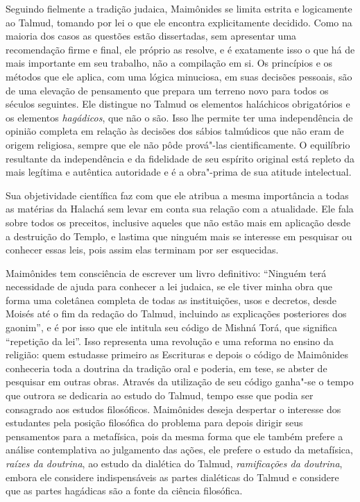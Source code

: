 Seguindo fielmente a tradição judaica, Maimônides se limita estrita e
logicamente ao Talmud, tomando por lei o que ele encontra
explicitamente decidido. Como na maioria dos casos as questões estão
dissertadas, sem apresentar uma recomendação firme e final, ele próprio
as resolve, e é exatamente isso o que há de mais importante em seu
trabalho, não a compilação em si. Os princípios e os métodos que ele
aplica, com uma lógica minuciosa, em suas decisões pessoais, são de uma
elevação de pensamento que prepara um terreno novo para todos os séculos
seguintes. Ele distingue no Talmud os elementos haláchicos
obrigatórios e os elementos \emph{hagádicos}, que não o são. Isso lhe permite
ter uma independência de opinião completa em relação às decisões dos
sábios talmúdicos que não eram de origem religiosa, sempre que ele não
pôde prová"-las cientificamente. O equilíbrio resultante da independência
e da fidelidade de seu espírito original está repleto da mais legítima
e autêntica autoridade e é a obra"-prima de sua atitude intelectual.

Sua objetividade científica faz com que ele atribua a mesma importância
a todas as matérias da Halachá sem levar em conta sua relação com a
atualidade. Ele fala sobre todos os preceitos, inclusive aqueles que não
estão mais em aplicação desde a destruição do Templo, e lastima que
ninguém mais se interesse em pesquisar ou conhecer essas leis, pois
assim elas terminam por ser esquecidas.

Maimônides tem consciência de escrever um livro definitivo: ``Ninguém
terá necessidade de ajuda para conhecer a lei judaica, se ele tiver
minha obra que forma uma coletânea completa de todas as instituições,
usos e decretos, desde Moisés até o fim da redação do Talmud,
incluindo as explicações posteriores dos gaonim'', e é por isso que ele
intitula seu código de Mishná Torá, que significa ``repetição da
lei''. Isso representa uma revolução e uma reforma no ensino da
religião: quem estudasse primeiro as Escrituras e depois o código de
Maimônides conheceria toda a doutrina da tradição oral e poderia, em
tese, se abster de pesquisar em outras obras. Através da utilização de
seu código ganha"-se o tempo que outrora se dedicaria ao estudo do
Talmud, tempo esse que podia ser consagrado aos estudos
filosóficos. Maimônides deseja despertar o interesse dos estudantes pela
posição filosófica do problema para depois dirigir seus pensamentos para
a metafísica, pois da mesma forma que ele também prefere a análise
contemplativa ao julgamento das ações, ele prefere o estudo da
metafísica, \emph{raízes da doutrina}, ao estudo da dialética do
Talmud, \emph{ramificações da doutrina}, embora ele considere
indispensáveis as partes dialéticas do Talmud e considere que as
partes hagádicas são a fonte da ciência filosófica.

